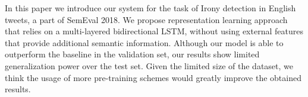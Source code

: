 In this paper we introduce our system for the task of Irony detection in English tweets, a part of SemEval 2018. We propose representation learning approach that relies on a multi-layered bidirectional LSTM, without using external features that provide additional semantic information. Although our model is able to outperform the baseline in the validation set, our results show limited generalization power over the test set. Given the limited size of the dataset, we think the usage of more pre-training schemes would greatly improve the obtained results.
